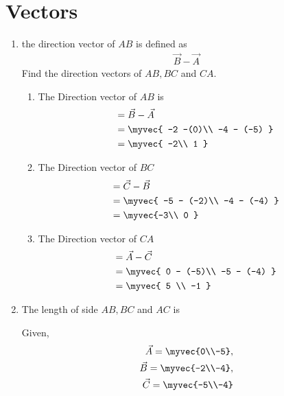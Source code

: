 \documentclass[11pt]{book}
\begin{document}
\section{Vectors}
\begin{enumerate}[label=\thesection.\arabic*.,ref=\thesection.\theenumi]
\item the direction vector of $AB$ is defined as 
\begin{align}
 \vec{B}-
  \vec{A}
\end{align}
Find the direction vectors of $AB, BC$ and $CA$.
\\
\solution
\begin{enumerate} 
\item  The Direction vector of $AB$ is 
\begin{align}&= \vec{B} - \vec{A} \\
 &= \myvec{ -2  -(0)\\ -4 - (-5) } \\&= \myvec{ -2\\ 1 }
 \end{align}
\item The Direction vector of $BC$ 
\begin{align}&= \vec{C} - \vec{B}\\
 &= \myvec{ -5 - (-2)\\ -4 - (-4) } \\&= \myvec{-3\\ 0 }
  \end{align}
  \item  The Direction vector of $CA$  
  \begin{align} &= \vec{A} - \vec{C} \\ 
 &= \myvec{ 0 - (-5)\\ -5 - (-4) } \\&= \myvec{ 5 \\ -1 }
  \end{align}
 \end{enumerate}

 \item The length of side $AB,BC$ and $AC$ is

		\solution
Given, 
\begin{align}
\vec{A} = \myvec{0\\-5},\\
\vec{B} = \myvec{-2\\-4},\\
\vec{C} = \myvec{-5\\-4} 
\end{align}


\end{enumerate}
\end{document}
